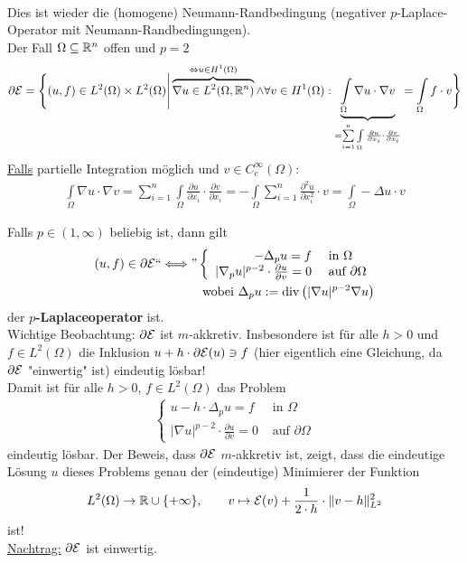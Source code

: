 \begin{beispiel}
\begin{align*}
	\end{align*}
	Dies ist wieder die (homogene) Neumann-Randbedingung (negativer $p$-Laplace-Operator mit Neumann-Randbedingungen).\\
	Der Fall $\Omega\subseteq\mathbb{R}^n$ offen und $p=2$
	\begin{align*}
		\partial\mathcal{E}=\Bigg\lbrace(u,f)\in L^2(\Omega)\times L^2(\Omega)\Bigg|\overbrace{\nabla u\in L^2(\Omega,\mathbb{R}^n)}^{\Leftrightarrow u\in H^1(\Omega)}\wedge\forall v\in H^1(\Omega):\underbrace{\int\limits_\Omega\nabla u\cdot \nabla v}_{=\sum\limits_{i=1}^n\int\limits_\Omega\frac{\partial u}{\partial x_i}\cdot\frac{\partial v}{\partial x_i}}=\int\limits_\Omega f\cdot v\Bigg\rbrace
	\end{align*}
	\underline{Falls} partielle Integration möglich und $v\in C^\infty_c(\Omega)$:
	\begin{align*}
		\int\limits_\Omega\nabla u\cdot \nabla v=\sum\limits_{i=1}^n\int\limits_\Omega\frac{\partial u}{\partial x_i}\cdot\frac{\partial v}{\partial x_i}=-\int\limits_\Omega\sum\limits_{i=1}^n\frac{\partial^2 u}{\partial x_i^2}\cdot v
		=\int\limits_\Omega-\Delta u\cdot v
	\end{align*}

	Falls $p\in(1,\infty)$ beliebig ist, dann gilt
	\begin{align*}
		(u,f)\in\partial\mathcal{E}``\Longleftrightarrow\text{''}\left\lbrace\begin{array}{rl}
			-\Delta_p u=f&\text{ in }\Omega\\
			|\nabla_p u|^{p-2}\cdot\frac{\partial u}{\partial v}=0 &\text{ auf }\partial\Omega
		\end{array}\right.\\
		\text{ wobei }\Delta_p u:=\operatorname{div}\left(|\nabla u|^{p-2}\nabla u\right)
	\end{align*}
	der \textbf{$p$-Laplaceoperator} ist.\\
	Wichtige Beobachtung: $\partial\mathcal{E}$ ist $m$-akkretiv. 
	Insbesondere ist für alle $h>0$ und $f\in L^2(\Omega)$ die Inklusion $u+h\cdot\partial\mathcal{E}(u)\ni f$ (hier eigentlich eine Gleichung, da $\partial\mathcal{E}$ "einwertig" ist) eindeutig lösbar!\\
	Damit ist für alle $h>0$, $f\in L^2(\Omega)$ das Problem
	\begin{align*}
		\left\lbrace\begin{array}{rl}
			u-h\cdot\Delta_p u=f &\text{ in }\Omega\\
			|\nabla u|^{p-2}\cdot\frac{\partial u}{\partial v}=0 &\text{ auf } \partial\Omega
		\end{array}\right.
	\end{align*}
	eindeutig lösbar. 
	Der Beweis, dass $\partial\mathcal{E}$ $m$-akkretiv ist, zeigt, dass die eindeutige Lösung $u$ dieses Problems genau der (eindeutige) Minimierer der Funktion
	\begin{align*}
		L^2(\Omega)\to\mathbb{R}\cup\lbrace+\infty\rbrace,\qquad
		v\mapsto\mathcal{E}(v)+\frac{1}{2\cdot h}\cdot\Vert v-h\Vert_{L^2}^2
	\end{align*}
	ist!\\
	\underline{Nachtrag:} $\partial\mathcal{E}$ ist einwertig.


\end{beispiel}
